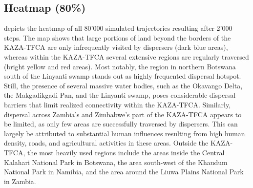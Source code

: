 \documentclass[abstract=on,10pt,a4paper,bibliography=totocnumbered]{article}
\begin{document}
\subsection{Heatmap (80\%)}
 depicts the heatmap of all 80'000 simulated trajectories
resulting after 2'000 steps. The map shows that large portions of land beyond
the borders of the KAZA-TFCA are only infrequently visited by dispersers (dark
blue areas), whereas within the KAZA-TFCA several extensive regions are
regularly traversed (bright yellow and red areas). Most notably, the region in
northern Botswana south of the Linyanti swamp stands out as highly frequented
dispersal hotspot. Still, the presence of several massive water bodies, such as
the Okavango Delta, the Makgadikgadi Pan, and the Linyanti swamp, poses
considerable dispersal barriers that limit realized connectivity within the
KAZA-TFCA. Similarly, dispersal across Zambia's and Zimbabwe's part of the
KAZA-TFCA appears to be limited, as only few areas are successfully traversed by
dispersers. This can largely be attributed to substantial human influences
resulting from high human density, roads, and agricultural activities in these
areas. Outside the KAZA-TFCA, the most heavily used regions include the areas
inside the Central Kalahari National Park in Botswana, the area south-west of
the Khaudum National Park in Namibia, and the area around the Liuwa Plains
National Park in Zambia.
\end{document}
